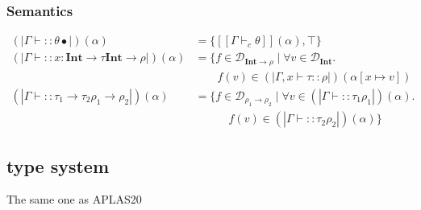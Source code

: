 \documentclass[runningheads]{llncs}
\newcommand {\val}[1]{[\![#1]\!]}
\newcommand {\domain}[1]{\mathcal{D}_{#1}}
\newcommand \stypeint {\textbf{Int}}
\newcommand \stypebool {\bullet}
\newcommand \srtype {\rho} %
\newcommand \constraint {\theta}
\newcommand \refty {\tau}
\newcommand \typeint[1]{{#1} : \stypeint}
\newcommand \typebool[1]{\stypebool \langle #1 \rangle}
\newcommand \refines[2]{#1:: #2}
\newcommand \tenv {\Gamma}
\newcommand \wf[2][]{\tenv \vdash \refines{#1}{#2}}
\newcommand {\semt}[1]{(\!|#1|\!)}
\newcommand {\srt}[2]{\semt{\wf{#1}{#2}}(\alpha)}
\begin{document}
\subsubsection{Semantics}

\begin{align*}
    \srt{\constraint}{\stypebool} &= \{\val{\tenv \vdash_c \constraint}(\alpha), \top \}\\
    \srt{\typeint{x} \rightarrow \refty}{\stypeint \rightarrow \srtype} &=
      \{f \in \domain{\stypeint \rightarrow \srtype} \mid \forall v \in \domain{\stypeint}. \\
          &\quad \quad f(v) \in \semt{\tenv, x \vdash \refty:: \srtype}(\alpha[x \mapsto v])\\
    \srt{\refty_1 \rightarrow \refty_2}{\srtype_1 \rightarrow \srtype_2} &= \{f \in \domain{\srtype_1 \rightarrow \srtype_2} \mid \forall v \in
        \srt{\refty_1}{\srtype_1}. \\
          &\quad \quad \quad f(v) \in \srt{\refty_2}{\srtype_2}\}
\end{align*}

\subsection{type system}

The same one as APLAS20

%
%
%
%
%
%
%
%
\end{document}
